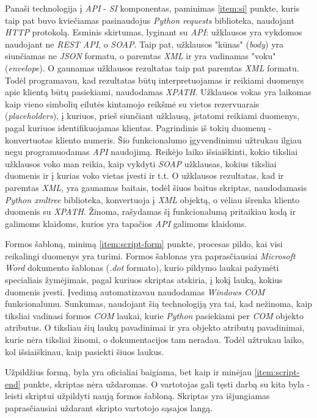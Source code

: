 \documentclass{VUMIFPSBakPrakAt}
\begin{document}
\par
Panaši technologija į \textit{API} - \textit{SI} komponentas, paminimas \ref{item:si} punkte, kuris taip pat buvo kviečiamas pasinaudojus \textit{Python requests} biblioteka, naudojant \textit{HTTP} protokolą. Esminis skirtumas, lyginant su \textit{API}: užklausos yra vykdomos naudojant ne \textit{REST API}, o \textit{SOAP}. Taip pat, užklausos "kūnas" (\textit{body}) yra siunčiamas ne \textit{JSON} formatu, o paremtas \textit{XML} ir yra vadinamas "voku" (\textit{envelope}). O gaunamas užklausos rezultatas taip pat paremtas \textit{XML} formatu. Todėl programavau, kad rezultatas būtų interpretuojamas ir reikiami duomenys apie klientą būtų pasiekiami, naudodamas \textit{XPATH}. Užklausos vokas yra laikomas kaip vieno simbolių eilutės kintamojo reikšmė su vietos rezervuarais (\textit{placeholders}), į kuriuos, prieš siunčiant užklausą, įstatomi reikiami duomenys, pagal kuriuos identifikuojamas klientas. Pagrindinis iš tokių duomenų - konvertuotas kliento numeris. Šio funkcionalumo įgyvendinimui užtrukau ilgiau negu programuodamas \textit{API} naudojimą. Reikėjo laiko išsiaiškinti, kokio tiksliai užklausos voko man reikia, kaip vykdyti \textit{SOAP} užklausas, kokius tiksliai duomenis ir į kurias voko vietas įvesti ir t.t. O užklausos rezultatas, kad ir paremtas \textit{XML}, yra gaunamas baitais, todėl šiuos baitus skriptas, naudodamasis \textit{Python xmltree} biblioteka, konvertuoja į \textit{XML} objektą, o vėliau išrenka kliento duomenis su \textit{XPATH}. Žinoma, rašydamas šį funkcionalumą pritaikiau kodą ir galimoms klaidoms, kurios yra tapačios \textit{API} galimoms klaidoms.
\par
Formos šabloną, minimą \ref{item:script-form} punkte, procesas pildo, kai visi reikalingi duomenys yra turimi. Formos šablonas yra paprasčiausiai \textit{Microsoft Word} dokumento šablonas (\textit{.dot} formato), kurio pildymo laukai pažymėti specialiais žymėjimais, pagal kuriuos skriptas atskiria, į kokį lauką, kokius duomenis įvesti. Įvedimą automatizavau naudodamas \textit{Windows COM} funkcionalumu. Sunkumas, naudojant šią technologiją yra tai, kad nežinoma, kaip tiksliai vadinasi formos \textit{COM} laukai, kurie \textit{Python} pasiekiami per \textit{COM} objekto atributus. O tiksliau šių laukų pavadinimai ir yra objekto atributų pavadinimai, kurie nėra tiksliai žinomi, o dokumentacijos tam neradau. Todėl užtrukau laiko, kol išsiaiškinau, kaip pasiekti šiuos laukus.
\par
Užpildžius formą, byla yra oficialiai baigiama, bet kaip ir minėjau \ref{item:script-end} punkte, skriptas nėra uždaromas. O vartotojas gali tęsti darbą su kita byla - leisti skriptui užpildyti naują formos šabloną. Skriptas yra išjungiamas paprasčiausiai uždarant skripto vartotojo sąsajos langą.
\end{document}

